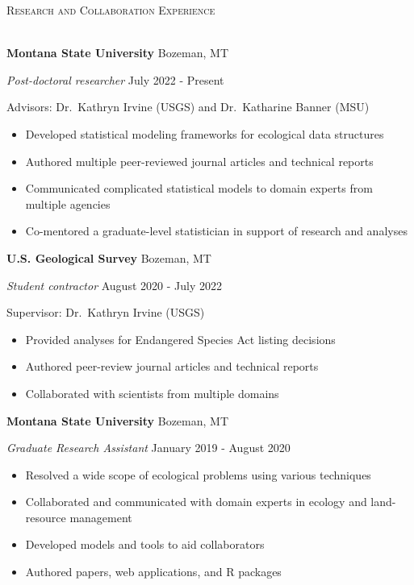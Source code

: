 \documentclass[a4paper]{article}
\newcommand{\lineunder} {
	\vspace*{-8pt} \\
	\hspace*{-18pt} \hrulefill \\
}
\newcommand{\header} [1] {
	{\hspace*{-18pt}\vspace*{6pt} \textsc{#1}}
	\vspace*{-6pt} \lineunder
}
\begin{document}
\header{Research and Collaboration Experience}
\vspace*{2mm}

\textbf{Montana State University} \hfill Bozeman, MT

\textit{Post-doctoral researcher} \hfill July 2022 - Present

Advisors: Dr.~Kathryn Irvine (USGS) and Dr.~Katharine Banner (MSU)

\vspace{-1mm}
\begin{itemize} \itemsep 1pt
    \item Developed statistical modeling frameworks for ecological data structures
    \item Authored multiple peer-reviewed journal articles and technical reports
    \item Communicated complicated statistical models to domain experts from multiple agencies
    \item Co-mentored a graduate-level statistician in support of research and analyses
\end{itemize}

\textbf{U.S. Geological Survey} \hfill Bozeman, MT

\textit{Student contractor} \hfill August 2020 - July 2022

Supervisor: Dr.~Kathryn Irvine (USGS)

\vspace{-1mm}
\begin{itemize} \itemsep 1pt
   \item Provided analyses for Endangered Species Act listing decisions
   \item Authored peer-review journal articles and technical reports
   \item Collaborated with scientists from multiple domains 
\end{itemize}

\textbf{Montana State University} \hfill Bozeman, MT

\textit{Graduate Research Assistant} \hfill January 2019 - August 2020

\vspace{-1mm}
\begin{itemize} \itemsep 1pt
   \item Resolved a wide scope of ecological problems using various techniques
   \item Collaborated and communicated with domain experts in ecology and land-resource management
   \item Developed models and tools to aid collaborators
   \item Authored papers, web applications, and R packages
\end{itemize}
\end{document}
